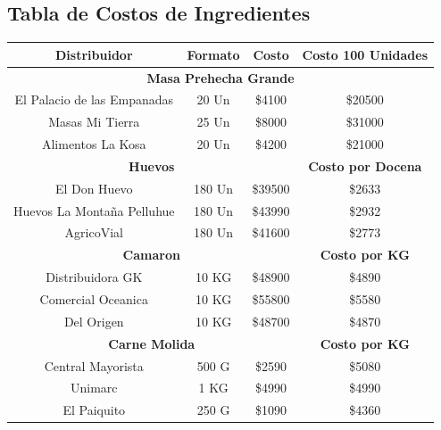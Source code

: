 \documentclass[12pt]{article}
\begin{document}
\subsection{Tabla de Costos de Ingredientes}

\begin{table}[H] %
    \centering
    \begin{tabular}{|| c | c | c | c||} 
        \hline
    \textbf{Distribuidor} & Formato & \textbf{Costo} & \textbf{Costo 100 Unidades} \\ [0.5ex]
        \hline\hline
        \multicolumn{4}{||c||}{\textbf{Masa Prehecha Grande}} \\ [0.5ex] \hline \hline
        El Palacio de las Empanadas & 20 Un & \$4100 & \$20500 \\ \hline
        Masas Mi Tierra & 25 Un & \$8000 & \$31000 \\ \hline
        Alimentos La Kosa & 20 Un & \$4200 & \$21000 \\ [1ex] \hline \hline

        \multicolumn{3}{||c||}{\textbf{Huevos}} & \textbf{Costo por Docena} \\ [0.5ex] \hline \hline
        El Don Huevo & 180 Un & \$39500 & \$2633 \\ \hline
        Huevos La Montaña Pelluhue & 180 Un & \$43990 & \$2932 \\ \hline
        AgricoVial & 180 Un & \$41600 & \$2773 \\ [1ex] \hline \hline

        \multicolumn{3}{||c|}{\textbf{Camaron}} & \textbf{Costo por KG} \\ [0.5ex] \hline \hline
        Distribuidora GK & 10 KG & \$48900 & \$4890 \\ \hline
        Comercial Oceanica & 10 KG & \$55800 & \$5580 \\ \hline
        Del Origen & 10 KG & \$48700 & \$4870 \\ [1ex] \hline \hline

        \multicolumn{3}{||c|}{\textbf{Carne Molida}} & \textbf{Costo por KG} \\ [0.5ex] \hline \hline %
        Central Mayorista & 500 G & \$2590 & \$5080 \\ \hline 
        Unimarc & 1 KG & \$4990 & \$4990 \\ \hline 
        El Paiquito & 250 G & \$1090 & \$4360 \\ [1ex] \hline \hline



\end{tabular}
\end{table}
\end{document}
